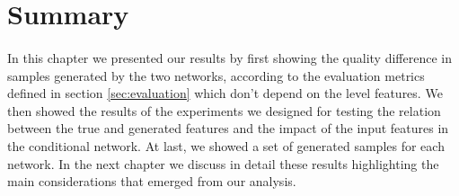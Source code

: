 \section{Summary}
\paragraph{} In this chapter we presented our results by first showing the quality difference in samples generated by the two networks, according to the evaluation metrics defined in section \ref{sec:evaluation} which don't depend on the level features. We then showed the results of the experiments we designed for testing the relation between the true and generated features and the impact of the input features in the conditional network. At last, we showed a set of generated samples for each network. In the next chapter we discuss in detail these results highlighting the main considerations that emerged from our analysis.